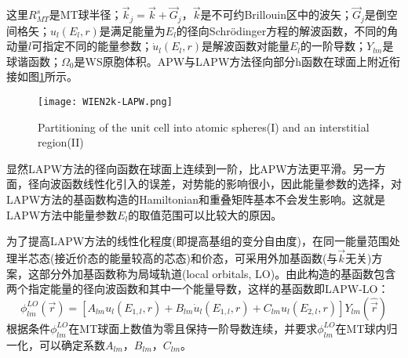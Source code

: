 这里$R_{MT}^s$是MT球半径；$\vec k_j=\vec k+\vec G_j$，$\vec k$是不可约Brillouin区中的波矢；$\vec G_j$是倒空间格矢；$u_l(E_l,r)$是满足能量为$E_l$的径向Schr\"odinger方程的解波函数，不同的角动量$l$可指定不同的能量参数；$\dot u_l(E_l,r)$是解波函数对能量$E_l$的一阶导数；$Y_{lm}$是球谐函数；$\Omega_0$是WS原胞体积。APW与LAPW方法径向部分h函数在球面上附近衔接如图\ref{Muffin_tin}所示。
\begin{figure}[h!]
\centering
\texttt{[image: WIEN2k-LAPW.png]}
\caption{\small \textrm{Partitioning of the unit cell into atomic spheres(I) and an interstitial region(II)}}%
\label{Muffin_tin}
\end{figure}
显然LAPW方法的径向函数在球面上连续到一阶，比APW方法更平滑。另一方面，径向波函数线性化引入的误差，对势能的影响很小，因此能量参数的选择，对LAPW方法的基函数构造的Hamiltonian和重叠矩阵基本不会发生影响。这就是LAPW方法中能量参数$E_l$的取值范围可以比较大的原因。%

为了提高LAPW方法的线性化程度(即提高基组的变分自由度)，在同一能量范围处理半芯态(接近价态的能量较高的芯态)和价态，可采用外加基函数(与$\vec k$无关)方案，这部分外加基函数称为局域轨道(local orbitals, LO)\cite{PRB43-6388_1991,Singh}。由此构造的基函数包含两个指定能量的径向波函数和其中一个能量导数，这样的基函数即LAPW-LO：
\begin{equation}
  \phi_{lm}^{LO}(\vec r)=[A_{lm}u_l(E_{1,l},r)+B_{lm}\dot u_l(E_{1,l},r)+C_{lm}u_l(E_{2,l},r)]Y_{lm}(\hat{\vec r})
  \label{eq:LAPW-LO}
\end{equation}
根据条件$\phi_{lm}^{LO}$在MT球面上数值为零且保持一阶导数连续，并要求$\phi_{lm}^{LO}$在MT球内归一化，可以确定系数$A_{lm}$，$B_{lm}$，$C_{lm}$。


